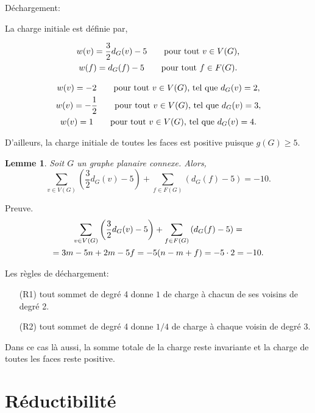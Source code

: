 \documentclass{beamer}
\newtheorem{lemme}{Lemme}
\begin{document}
\begin{frame}
Déchargement:

La charge initiale est définie par,

$$
\gathered
w(v) = \frac{3}{2} d_G(v) - 5 \qquad \textrm{pour tout $v\in V(G)$,} \\
w(f) = d_G(f) - 5 \qquad \textrm{pour tout $f\in F(G)$.}
\endgathered
$$

\pause

$$
\gathered
w(v) = -2 \qquad \textrm{pour tout $v \in V(G)$, tel que } d_G(v) = 2,\\
w(v) = -\frac{1}{2} \qquad \textrm{pour tout $v \in V(G)$, tel que } d_G(v) = 3,\\
w(v) =  1 \qquad \textrm{pour tout $v \in V(G)$, tel que } d_G(v) = 4.
\endgathered
$$

D'ailleurs, la charge initiale de toutes les faces est positive puisque $g(G) \geq 5$.
\end{frame}

\begin{frame}
\begin{lemme}
Soit $G$ un graphe planaire connexe. Alors,
$$
\sum_{v \in V(G)} \left(\frac{3}{2} d_G(v) - 5\right) + \sum_{f\in F(G)} \left(d_G(f) -5\right) = -10.
$$
\end{lemme}
Preuve.
$$ 
\gathered
\sum_{v \in V(G)} \left(\frac{3}{2}d_G(v) - 5\right) + \sum_{f\in F(G)} \left(d_G(f) -5\right) =\\
= 3m -5n + 2m - 5f = -5(n - m + f) = -5 \cdot 2 = -10.
\endgathered
$$
\end{frame}

\begin{frame}
Les règles de déchargement:
\begin{enumerate}
\item[(R1)] tout sommet de degré 4 donne $1$ de charge à chacun de ses voisins de degré 2.
\item[(R2)] tout sommet de degré 4 donne $1/4$ de charge à chaque voisin de degré 3.
\end{enumerate}
Dans ce cas là aussi, la somme totale de la charge reste invariante et la charge de toutes les faces reste positive.
\end{frame}


\section{Réductibilité}
\subsection{ }
%  
%
\end{document}
